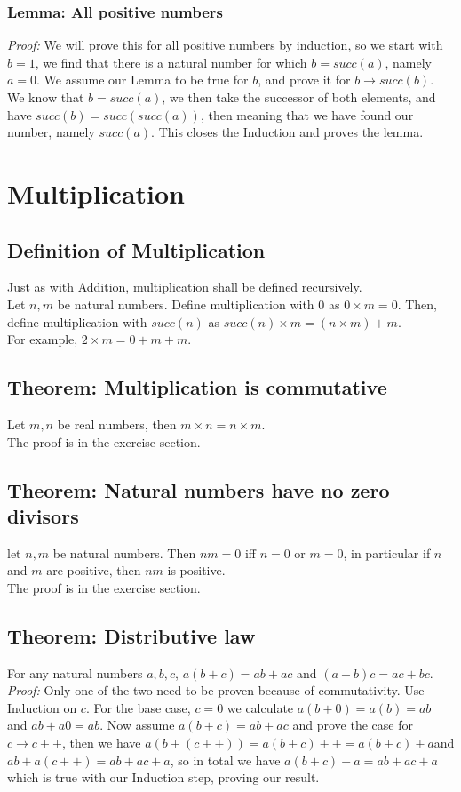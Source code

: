 \subsubsection*{Lemma: All positive numbers}
\textit{Proof:} We will prove this for all positive numbers by induction, so we start with $b = 1$, we find that there is a natural number for which $b = succ(a)$, namely $a = 0$. We assume our Lemma to be true for $b$, and prove it for $b\rightarrow succ(b)$. We know that $b = succ(a)$, we then take the successor of both elements, and have $succ(b) = succ(succ(a))$, then meaning that we have found our number, namely $succ(a)$. This closes the Induction and proves the lemma.

\section{Multiplication}

\subsection{Definition of Multiplication}
Just as with Addition, multiplication shall be defined recursively.\\
Let $n, m$ be natural numbers. Define multiplication with 0 as $0 \times m = 0$. Then, define multiplication with $succ(n)$ as $succ(n) \times m = (n \times m) + m$.\\
For example, $2 \times m = 0 + m + m$.

\subsection{Theorem: Multiplication is commutative}
Let $m,n$ be real numbers, then $m\times n = n\times m$.\\
The proof is in the exercise section.

\subsection{Theorem: Natural numbers have no zero divisors}
let $n,m$ be natural numbers. Then $n m = 0$ iff $n = 0$ or $m = 0$, in particular if $n$ and $m$ are positive, then $nm$ is positive.\\
The proof is in the exercise section.

\subsection{Theorem: Distributive law}
For any natural numbers $a,b,c$, $a(b+c) = ab + ac$ and $(a+b)c = ac+bc$.\\
\textit{Proof:} Only one of the two need to be proven because of commutativity. Use Induction on $c$. For the base case, $c=0$ we calculate $a(b+0) = a(b) = ab$ and $ab + a0 = ab$. Now assume $a(b+c) = ab + ac$ and prove the case for $c\rightarrow c++$, then we have $a(b+(c++)) = a(b+c)++ = a(b+c) + a$and $ab + a(c++) = ab + ac + a$, so in total we have $a(b+c) + a = ab + ac + a$ which is true with our Induction step, proving our result.

